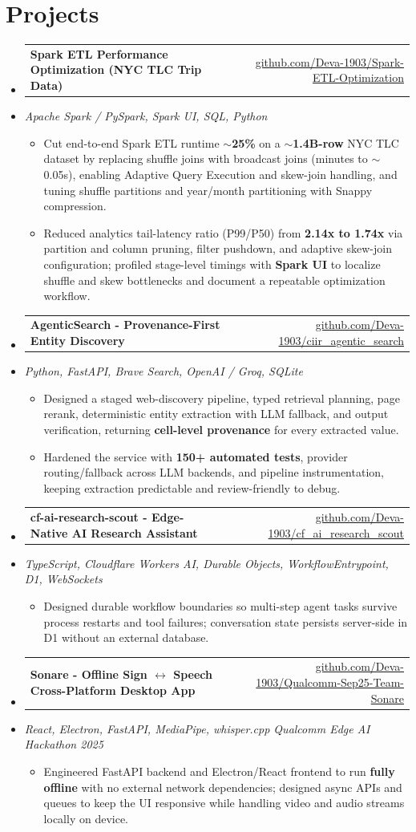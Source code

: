 \documentclass[letterpaper,10pt]{article}
\makeatletter
\newcommand{\resumeItem}[1]{
  \item\small{#1\vspace{-1pt}}
}
\newcommand{\resumeProjectHeading}[2]{
    \item
    \begin{tabular*}{0.985\textwidth}[t]{l@{\extracolsep{\fill}}r}
      \small\textbf{#1} & \small #2 \\
    \end{tabular*}\vspace{-5pt}
}
\newcommand{\resumeProjectSubheading}[1]{
  \vspace{-2pt}\item[] {\small\textcolor{ResumeSlate}{\emph{#1}}}\vspace{-3pt}
}
\newcommand{\resumeSubHeadingListStart}{\begin{itemize}[leftmargin=0.0in, label={}, itemsep=2pt, topsep=2pt]}
\newcommand{\resumeSubHeadingListEnd}{\end{itemize}}
\newcommand{\resumeItemListStart}{\begin{itemize}[leftmargin=0.18in, itemsep=2pt, topsep=1pt]}
\newcommand{\resumeItemListEnd}{\end{itemize}\vspace{-4pt}}
\makeatother
\begin{document}
\section{Projects}
\resumeSubHeadingListStart
  \resumeProjectHeading
    {Spark ETL Performance Optimization (NYC TLC Trip Data)}
    {\href{https://github.com/Deva-1903/Spark-ETL-Optimization}{github.com/Deva-1903/Spark-ETL-Optimization}}
  \resumeProjectSubheading{Apache Spark / PySpark, Spark UI, SQL, Python}
    \resumeItemListStart
      \resumeItem{Cut end-to-end Spark ETL runtime \textbf{$\sim$25\%} on a \textbf{$\sim$1.4B-row} NYC TLC dataset by replacing shuffle joins with broadcast joins (minutes to $\sim$0.05s), enabling Adaptive Query Execution and skew-join handling, and tuning shuffle partitions and year/month partitioning with Snappy compression.}
      \resumeItem{Reduced analytics tail-latency ratio (P99/P50) from \textbf{2.14x to 1.74x} via partition and column pruning, filter pushdown, and adaptive skew-join configuration; profiled stage-level timings with \textbf{Spark UI} to localize shuffle and skew bottlenecks and document a repeatable optimization workflow.}
    \resumeItemListEnd
  \resumeProjectHeading
    {AgenticSearch - Provenance-First Entity Discovery}
    {\href{https://github.com/Deva-1903/ciir_agentic_search}{github.com/Deva-1903/ciir\_agentic\_search}}
  \resumeProjectSubheading{Python, FastAPI, Brave Search, OpenAI / Groq, SQLite}
    \resumeItemListStart
      \resumeItem{Designed a staged web-discovery pipeline, typed retrieval planning, page rerank, deterministic entity extraction with LLM fallback, and output verification, returning \textbf{cell-level provenance} for every extracted value.}
      \resumeItem{Hardened the service with \textbf{150+ automated tests}, provider routing/fallback across LLM backends, and pipeline instrumentation, keeping extraction predictable and review-friendly to debug.}
    \resumeItemListEnd
  \resumeProjectHeading
    {cf-ai-research-scout - Edge-Native AI Research Assistant}
    {\href{https://github.com/Deva-1903/cf_ai_research_scout}{github.com/Deva-1903/cf\_ai\_research\_scout}}
  \resumeProjectSubheading{TypeScript, Cloudflare Workers AI, Durable Objects, WorkflowEntrypoint, D1, WebSockets}
    \resumeItemListStart
      \resumeItem{Designed durable workflow boundaries so multi-step agent tasks survive process restarts and tool failures; conversation state persists server-side in D1 without an external database.}
    \resumeItemListEnd
  \resumeProjectHeading
    {Sonare - Offline Sign \(\leftrightarrow\) Speech Cross-Platform Desktop App}
    {\href{https://github.com/Deva-1903/Qualcomm-Sep25-Team-Sonare}{github.com/Deva-1903/Qualcomm-Sep25-Team-Sonare}}
  \resumeProjectSubheading{React, Electron, FastAPI, MediaPipe, whisper.cpp \enspace\textbar\enspace Qualcomm Edge AI Hackathon 2025}
    \resumeItemListStart
      \resumeItem{Engineered FastAPI backend and Electron/React frontend to run \textbf{fully offline} with no external network dependencies; designed async APIs and queues to keep the UI responsive while handling video and audio streams locally on device.}
    \resumeItemListEnd
\resumeSubHeadingListEnd
\vspace{-4pt}
\end{document}
